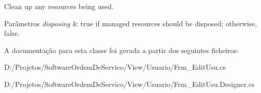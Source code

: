 Clean up any resources being used. 


\begin{DoxyParams}{Parâmetros}
{\em disposing} & true if managed resources should be disposed; otherwise, false.\\
\hline
\end{DoxyParams}


A documentação para esta classe foi gerada a partir dos seguintes ficheiros\+:\begin{DoxyCompactItemize}
\item 
D\+:/\+Projetos/\+Software\+Ordem\+De\+Servico/\+View/\+Usuario/Frm\+\_\+\+Edit\+Usu.\+cs\item 
D\+:/\+Projetos/\+Software\+Ordem\+De\+Servico/\+View/\+Usuario/Frm\+\_\+\+Edit\+Usu.\+Designer.\+cs\end{DoxyCompactItemize}
